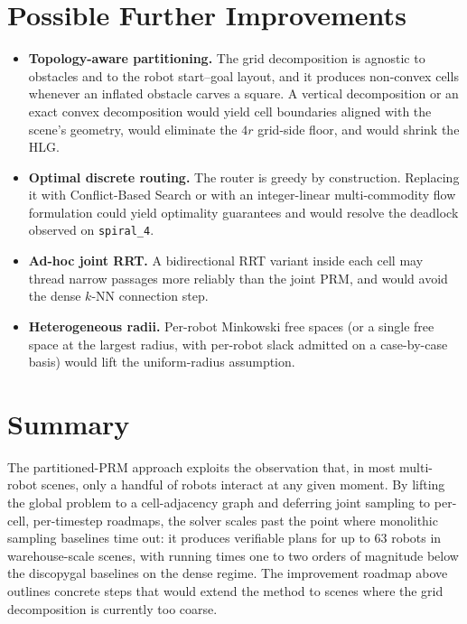 \documentclass[12pt,a4paper]{article}
\begin{document}
    \section{Possible Further Improvements}
    \label{sec:improvements}
    \begin{itemize}
        \item \textbf{Topology-aware partitioning.} The grid decomposition is agnostic to obstacles and to the robot start--goal layout, and it produces non-convex cells whenever an inflated obstacle carves a square. A vertical decomposition or an exact convex decomposition would yield cell boundaries aligned with the scene's geometry, would eliminate the $4r$ grid-side floor, and would shrink the HLG.
        \item \textbf{Optimal discrete routing.} The router is greedy by construction. Replacing it with Conflict-Based Search \citep{SHARON201540} or with an integer-linear multi-commodity flow formulation could yield optimality guarantees and would resolve the deadlock observed on \texttt{spiral\_4}.
        \item \textbf{Ad-hoc joint RRT.} A bidirectional RRT variant inside each cell may thread narrow passages more reliably than the joint PRM, and would avoid the dense $k$-NN connection step.
        \item \textbf{Heterogeneous radii.} Per-robot Minkowski free spaces (or a single free space at the largest radius, with per-robot slack admitted on a case-by-case basis) would lift the uniform-radius assumption.
    \end{itemize}


    \section{Summary}
    The partitioned-PRM approach exploits the observation that, in most multi-robot scenes, only a handful of robots interact at any given moment. By lifting the global problem to a cell-adjacency graph and deferring joint sampling to per-cell, per-timestep roadmaps, the solver scales past the point where monolithic sampling baselines time out: it produces verifiable plans for up to $63$ robots in warehouse-scale scenes, with running times one to two orders of magnitude below the discopygal baselines on the dense regime. The improvement roadmap above outlines concrete steps that would extend the method to scenes where the grid decomposition is currently too coarse.

    
    
\end{document}

